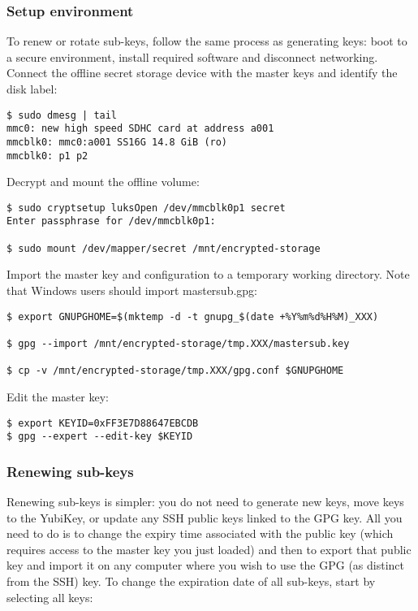 \subsubsection{Setup environment}
To renew or rotate sub-keys, follow the same process as  generating keys: boot to a secure environment, install required software  and disconnect networking.
Connect the offline secret storage device with the master keys and identify the disk label:

\begin{verbatim}
$ sudo dmesg | tail
mmc0: new high speed SDHC card at address a001
mmcblk0: mmc0:a001 SS16G 14.8 GiB (ro)
mmcblk0: p1 p2
\end{verbatim}

Decrypt and mount the offline volume:

\begin{verbatim}
$ sudo cryptsetup luksOpen /dev/mmcblk0p1 secret
Enter passphrase for /dev/mmcblk0p1:

$ sudo mount /dev/mapper/secret /mnt/encrypted-storage
\end{verbatim}

Import the master key and configuration to a temporary working directory. Note that Windows users should import mastersub.gpg:

\begin{verbatim}
$ export GNUPGHOME=$(mktemp -d -t gnupg_$(date +%Y%m%d%H%M)_XXX)

$ gpg --import /mnt/encrypted-storage/tmp.XXX/mastersub.key

$ cp -v /mnt/encrypted-storage/tmp.XXX/gpg.conf $GNUPGHOME
\end{verbatim}

Edit the master key:

\begin{verbatim}
$ export KEYID=0xFF3E7D88647EBCDB
$ gpg --expert --edit-key $KEYID
\end{verbatim}

\subsubsection{Renewing sub-keys}
Renewing sub-keys is simpler: you do not need to generate  new keys, move keys to the YubiKey, or update any SSH public keys linked  to the GPG key.  All you need to do is to change the expiry time  associated with the public key (which requires access to the master key  you just loaded) and then to export that public key and import it on any  computer where you wish to use the GPG (as distinct from the SSH) key.
To change the expiration date of all sub-keys, start by selecting all keys:

